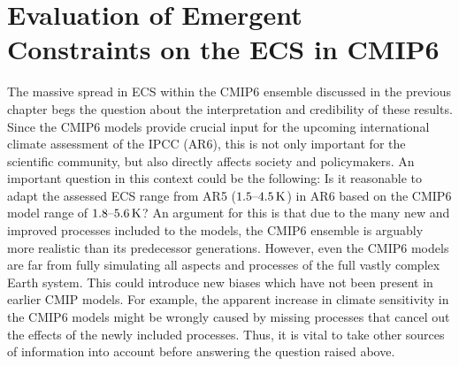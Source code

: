 


\chapter{Evaluation of Emergent Constraints on the \acl{ECS} in \acs{CMIP}6}
\label{ch:05:paper_ecs}

The massive spread in \ac{ECS} within the \acs{CMIP}6 ensemble discussed in the
previous chapter begs the question about the interpretation and credibility of
these results. Since the \acs{CMIP}6 models provide crucial input for the
upcoming international climate assessment of the \ac{IPCC} (\acs{AR}6), this is
not only important for the scientific community, but also directly affects
society and policymakers. An important question in this context could be the
following: Is it reasonable to adapt the assessed \ac{ECS} range from \acs{AR}5
($\range{1.5}{4.5} \unit{K}$) in \acs{AR}6 based on the \acs{CMIP}6 model range
of $\range{1.8}{5.6} \unit{K}$? An argument for this is that due to the many
new and improved processes included to the models, the \acs{CMIP}6 ensemble is
arguably more realistic than its predecessor generations. However, even the
\acs{CMIP}6 models are far from fully simulating all aspects and processes of
the full vastly complex Earth system. This could introduce new biases which
have not been present in earlier \ac{CMIP} models. For example, the apparent
increase in climate sensitivity in the \acs{CMIP}6 models might be wrongly
caused by missing processes that cancel out the effects of the newly included
processes. Thus, it is vital to take other sources of information into account
before answering the question raised above.

